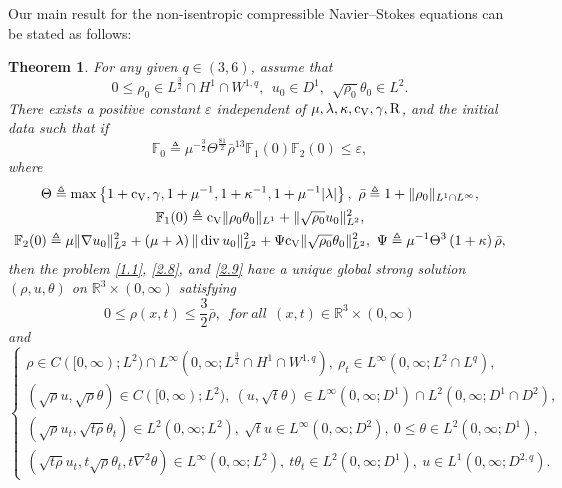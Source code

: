 \documentclass[11pt]{article}
\newtheorem{Theorem}{Theorem}[section]
\DeclareMathOperator{\divv}{div}
\begin{document}
Our main result for the non-isentropic compressible Navier--Stokes equations can be stated as follows:
\begin{Theorem}\label{thm2.2}
For any given $q\in(3, 6)$, assume that
\begin{equation}\label{2.10}
0 \leq \rho_0 \in L^{\frac{3}{2}} \cap H^1 \cap W^{1,q}, \ \ u_0 \in D^1,\ \ \sqrt{\rho_0}\theta_0\in L^2.
\end{equation}
There exists a positive constant $\varepsilon$ independent of $\mu, \lambda, \kappa, {\rm c_V}, \gamma, {\rm R}$, and the initial data such that if
\begin{equation}\label{2.11}
\mathbb{F}_0
\triangleq \mu^{-\frac{3}{2}} \Theta^{\frac{81}{2}} \bar{\rho}^{13} \mathbb{F}_1 (0) \mathbb{F}_2(0) \leq \varepsilon,
\end{equation}
where
\begin{gather*}
\Theta \triangleq \max\left\{1 + {\rm c_V}, \gamma, 1 + \mu^{-1}, 1 + \kappa^{-1}, 1 + \mu^{-1} |\lambda|\right\},\ \bar{\rho} \triangleq 1 + \|\rho_0\|_{L^1 \cap L^{\infty }},\\
\mathbb{F}_1 (0) \triangleq {\rm c_V} \|\rho_0 \theta _0\|_{L^1} + \|\sqrt{\rho_0} u_0\|_{L^2}^2,
\\
\mathbb{F}_2 (0) \triangleq \mu \|\nabla u_0\|_{L^2}^2 + \left(\mu + \lambda \right) \|\divv u_0\|_{L^2}^2 + \Psi {\rm c_V} \|\sqrt{\rho_0} \theta _0\|_{L^2}^2,\
\Psi \triangleq \mu^{-1} \Theta^3 \left(1 + \kappa \right) \bar{\rho},
\end{gather*}
then the problem \eqref{1.1}, \eqref{2.8}, and \eqref{2.9} have a unique global strong solution $(\rho, u, \theta)$ on $\mathbb{R}^3 \times (0,\infty)$ satisfying
\begin{equation}\label{2.12}
0\leq \rho(x,t)\leq \frac{3}{2}\bar\rho,\ \ {for \ all}\ \  (x,t)\in \mathbb{R}^3 \times(0, \infty)
\end{equation}
and
\begin{equation}\label{2.13}
\begin{cases}
\rho \in C([0,\infty);L^2) \cap L^\infty(0,\infty;L^{\frac{3}{2}} \cap H^1 \cap W^{1,q}), \ \rho_t \in L^\infty(0,\infty;L^2\cap L^q),\\[1mm]
(\sqrt \rho u, \sqrt \rho \theta ) \in C ([0,\infty);L^2), \ (u, \sqrt t \theta ) \in L^\infty(0,\infty; D^1) \cap L^2 (0,\infty; D^1 \cap D^{2}),\\[1mm]
(\sqrt \rho u_t, \sqrt{t \rho} \theta _t) \in L^2 (0,\infty; L^2), \ \sqrt t u \in L^\infty(0,\infty; D^{2}),\ 0 \leq \theta \in L^2 (0,\infty;D^1),\\[1mm]
(\sqrt{t \rho} u_t, t \sqrt \rho \theta _t, t \nabla^2 \theta ) \in L^\infty(0,\infty;L^2), \ t \theta _t \in L^2 (0,\infty; D^1), \ u \in L^1 (0,\infty; D^{2,q}).
\end{cases}
\end{equation}


\end{Theorem}
\end{document}
